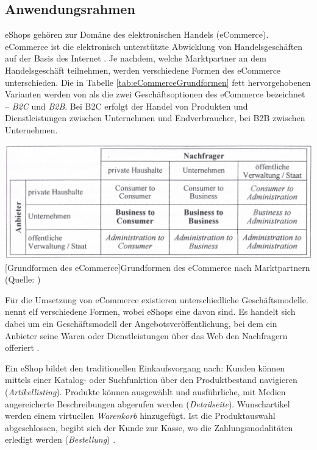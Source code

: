 \documentclass[11pt, a4paper, titlepage, listof=totoc, bibliography=totoc, index=totoc, twoside, openright, headings=normal]{scrreprt}
\begin{document}
\subsection{Anwendungsrahmen}
\label{eCommerce:Anwendungsrahmen}
eShops gehören zur Domäne des elektronischen Handels (eCommerce). eCommerce ist \glqq die elektronisch unterstützte Abwicklung von Handelsgeschäften auf der Basis des Internet\grqq{} \citep{schwarze02}. Je nachdem, welche Marktpartner an dem Handelsgeschäft teilnehmen, werden verschiedene Formen des eCommerce unterschieden. Die in Tabelle \ref{tab:eCommerceGrundformen} fett hervorgehobenen Varianten werden von \citet{meier12} als \glqq die zwei Geschäftsoptionen des eCommerce\grqq{} bezeichnet -- \emph{\ac{B2C}} und \emph{\ac{B2B}}. Bei \ac{B2C} erfolgt der Handel von Produkten und Dienstleistungen zwischen Unternehmen und Endverbraucher, bei \ac{B2B} zwischen Unternehmen.

\vspace{1em}
\begin{minipage}{\linewidth}
	\centering
	\includegraphics[width=0.6\linewidth]{Abbildungen/eCommerceGrundformen.png}
	[Grundformen des eCommerce]{Grundformen des eCommerce nach Marktpartnern (Quelle: \citet{schwarze02})}
	\label{tab:eCommerceGrundformen}
\end{minipage}
\vspace{0.1em}

Für die Umsetzung von eCommerce existieren unterschiedliche Geschäftsmodelle. \citet{timmers98} nennt elf verschiedene Formen, wobei eShops eine davon sind. Es handelt sich dabei um ein \glqq Geschäftsmodell der Angebotsveröffentlichung, bei dem ein Anbieter seine Waren oder Dienstleistungen über das Web den Nachfragern offeriert\grqq{} \citep{bartelt00}.

Ein eShop bildet den traditionellen Einkaufsvorgang nach: Kunden können mittels einer Katalog- oder Suchfunktion über den Produktbestand navigieren (\emph{Artikellisting}). Produkte können ausgewählt und ausführliche, mit Medien angereicherte Beschreibungen abgerufen werden (\emph{Detailseite}). Wunschartikel werden einem virtuellen \emph{Warenkorb} hinzugefügt. Ist die Produktauswahl abgeschlossen, begibt sich der Kunde zur \glqq Kasse\grqq{}, wo die Zahlungsmodalitäten erledigt werden (\emph{Bestellung}) \citep{boles00}.
\end{document}
